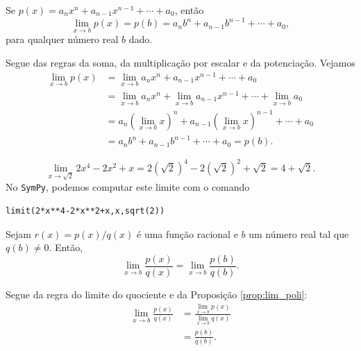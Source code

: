 \begin{prop}\label{prop:lim_poli}
  Se $p(x) = a_nx^n + a_{n-1}x^{n-1} + \cdots + a_0$, então
  \begin{equation}
    \lim_{x\to b} p(x) = p(b) = a_nb^n + a_{n-1}b^{n-1} + \cdots + a_0,
  \end{equation}
  para qualquer número real $b$ dado.
\end{prop}
\begin{dem}
  Segue das regras da soma, da multiplicação por escalar e da potenciação. Vejamos
  \begin{align}
    \lim_{x\to b} p(x) &= \lim_{x\to b} a_nx^n + a_{n-1}x^{n-1} + \cdots + a_0\\
                       &= \lim_{x\to b} a_nx^n + \lim_{x\to b} a_{n-1}x^{n-1} + \cdots + \lim_{x\to b} a_0\\
                       &= a_n\left(\lim_{x\to b} x\right)^n + a_{n-1}\left(\lim_{x\to b} x\right)^{n-1} + \cdots + a_0\\
                       &= a_nb^n + a_{n-1}b^{n-1} + \cdots + a_0 = p(b).
  \end{align}
\end{dem}

\begin{ex}
  \begin{equation}
    \lim_{x\to \sqrt{2}} 2x^4 - 2x^2 + x = 2(\sqrt{2})^4 - 2(\sqrt{2})^2 + \sqrt{2} = 4+\sqrt{2}.
  \end{equation}
  \ifispython
  No \verb+SymPy+, podemos computar este limite com o comando
\begin{verbatim}
limit(2*x**4-2*x**2+x,x,sqrt(2))
\end{verbatim}
  \fi
\end{ex}

\begin{prop}
  Sejam $r(x) = p(x)/q(x)$ é uma função racional e $b$ um número real tal que $q(b)\neq 0$. Então,
  \begin{equation}
    \lim_{x\to b} \frac{p(x)}{q(x)} = \lim_{x\to b} \frac{p(b)}{q(b)}.
  \end{equation}
\end{prop}
\begin{dem}
  Segue da regra do limite do quociente e da Proposição \ref{prop:lim_poli}:
  \begin{align}
    \lim_{x\to b} \frac{p(x)}{q(x)} &= \frac{\lim_{x\to b} p(x)}{\lim_{x\to b} q(x)} \\
    &= \frac{p(b)}{q(b)}.
  \end{align}
\end{dem}

